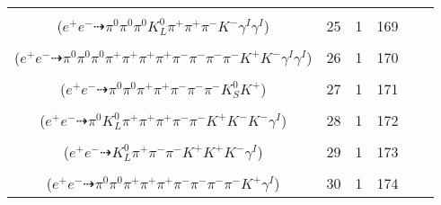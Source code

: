 \documentclass[landscape]{article}
\newcounter{rownumbers}
\newcommand\rn{\stepcounter{rownumbers}\arabic{rownumbers}}
\newcommand{\EOL}{\\} %
\newcommand{\topoTags}[1]{#1} %
\begin{document}
\begin{longtable}{clcccc}
\rn & \makecell[l]{ $ 
e^{+} e^{-} \rightarrow \pi^{0} \pi^{+} \pi^{+} \rho^{-} K^{0} K^{*-} \gamma^{I} \gamma^{I} ,
\rho^{-} \rightarrow \pi^{0} \pi^{-} ,
K^{0} \rightarrow K_{L}^{0} ,
K^{*-} \rightarrow \pi^{0} K^{-} 
$ \\ ($
e^{+} e^{-} \dashrightarrow \pi^{0} \pi^{0} \pi^{0} K_{L}^{0} \pi^{+} \pi^{+} \pi^{-} K^{-} \gamma^{I} \gamma^{I} 
$) } & \topoTags{25 & }1 & 169 \EOL

\rn & \makecell[l]{ $ 
e^{+} e^{-} \rightarrow \pi^{0} \pi^{+} \pi^{+} \pi^{-} \rho^{-} \omega K^{*} \bar{K}^{*} \gamma^{I} \gamma^{I} ,
\rho^{-} \rightarrow \pi^{0} \pi^{-} ,
\omega \rightarrow \pi^{0} \pi^{+} \pi^{-} ,
K^{*} \rightarrow \pi^{-} K^{+} ,
\bar{K}^{*} \rightarrow \pi^{+} K^{-} 
$ \\ ($
e^{+} e^{-} \dashrightarrow \pi^{0} \pi^{0} \pi^{0} \pi^{+} \pi^{+} \pi^{+} \pi^{+} \pi^{-} \pi^{-} \pi^{-} \pi^{-} K^{+} K^{-} \gamma^{I} \gamma^{I} 
$) } & \topoTags{26 & }1 & 170 \EOL

\rn & \makecell[l]{ $ 
e^{+} e^{-} \rightarrow \pi^{0} \pi^{0} \rho^{0} \pi^{+} \pi^{-} \bar{K}^{0} K^{*} ,
\rho^{0} \rightarrow \pi^{+} \pi^{-} ,
\bar{K}^{0} \rightarrow K_{S}^{0} ,
K^{*} \rightarrow \pi^{-} K^{+} 
$ \\ ($
e^{+} e^{-} \dashrightarrow \pi^{0} \pi^{0} \pi^{+} \pi^{+} \pi^{-} \pi^{-} \pi^{-} K_{S}^{0} K^{+} 
$) } & \topoTags{27 & }1 & 171 \EOL

\rn & \makecell[l]{ $ 
e^{+} e^{-} \rightarrow \pi^{+} \omega K^{0} K^{*} \bar{K}^{*} K^{-} \gamma^{I} ,
\omega \rightarrow \pi^{0} \pi^{+} \pi^{-} ,
K^{0} \rightarrow K_{L}^{0} ,
K^{*} \rightarrow \pi^{-} K^{+} ,
\bar{K}^{*} \rightarrow \pi^{+} K^{-} 
$ \\ ($
e^{+} e^{-} \dashrightarrow \pi^{0} K_{L}^{0} \pi^{+} \pi^{+} \pi^{+} \pi^{-} \pi^{-} K^{+} K^{-} K^{-} \gamma^{I} 
$) } & \topoTags{28 & }1 & 172 \EOL

\rn & \makecell[l]{ $ 
e^{+} e^{-} \rightarrow \rho^{0} \pi^{-} \bar{K}^{0} K^{+} K^{+} K^{-} \gamma^{I} ,
\rho^{0} \rightarrow \pi^{+} \pi^{-} ,
\bar{K}^{0} \rightarrow K_{L}^{0} 
$ \\ ($
e^{+} e^{-} \dashrightarrow K_{L}^{0} \pi^{+} \pi^{-} \pi^{-} K^{+} K^{+} K^{-} \gamma^{I} 
$) } & \topoTags{29 & }1 & 173 \EOL

\rn & \makecell[l]{ $ 
e^{+} e^{-} \rightarrow \rho^{0} \pi^{-} \omega \bar{K}^{*} K^{+} \gamma^{I} ,
\rho^{0} \rightarrow \pi^{+} \pi^{-} ,
\omega \rightarrow \pi^{0} \pi^{+} \pi^{-} ,
\bar{K}^{*} \rightarrow \pi^{0} \bar{K}^{0} ,
\bar{K}^{0} \rightarrow K_{S}^{0} ,
K_{S}^{0} \rightarrow \pi^{+} \pi^{-} 
$ \\ ($
e^{+} e^{-} \dashrightarrow \pi^{0} \pi^{0} \pi^{+} \pi^{+} \pi^{+} \pi^{-} \pi^{-} \pi^{-} \pi^{-} K^{+} \gamma^{I} 
$) } & \topoTags{30 & }1 & 174 \EOL


\end{longtable}
\end{document}
